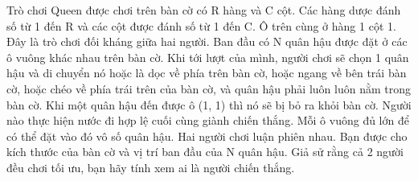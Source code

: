Trò chơi Queen được chơi trên bàn cờ có R hàng và C cột. Các hàng dược đánh số từ 1 đến R và các cột được đánh số từ 1 đến C. Ô trên cùng ở hàng 1 cột 1. Đây là trò chơi đối kháng giữa hai người. Ban đầu có N quân hậu được đặt ở các ô vuông khác nhau trên bàn cờ. Khi tới lượt của mình, người chơi sẽ chọn 1 quân hậu và di chuyển nó hoặc là dọc về phía trên bàn cờ, hoặc ngang về bên trái bàn cờ, hoặc chéo về phía trái trên của bàn cờ, và quân hậu phải luôn luôn nằm trong bàn cờ. Khi một quân hậu đến được ô (1, 1) thì nó sẽ bị bỏ ra khỏi bàn cờ. Người nào thực hiện nước đi hợp lệ cuối cùng giành chiến thắng. Mỗi ô vuông đủ lớn để có thể đặt vào đó vô số quân hậu. Hai người chơi luận phiên nhau. Bạn được cho kích thước của bàn cờ và vị trí ban đầu của N quân hậu. Giả sử rằng cả 2 người đều chơi tối ưu, bạn hãy tính xem ai là người chiến thắng.   

\